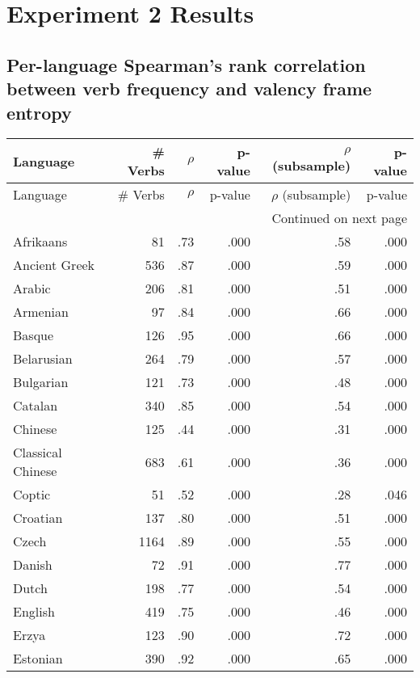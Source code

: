 \chapter{Experiment 2 Results}
\section{Per-language Spearman's rank correlation between verb frequency and valency frame entropy}\label{appendix:exp2-rho-freq-valency}
\begin{longtable}{lrrrrr}
    \toprule
    Language & \# Verbs & $\rho$ & p-value & $\rho$ (subsample) & p-value \\
    \midrule
    \endfirsthead
    \toprule
    Language & \# Verbs & $\rho$ & p-value & $\rho$ (subsample) & p-value \\
    \midrule
    \endhead
    \midrule
    \multicolumn{6}{r}{Continued on next page} \\
    \midrule
    \endfoot
    \bottomrule
    \endlastfoot
    Afrikaans & 81 & .73 & .000 & .58 & .000 \\
    Ancient Greek & 536 & .87 & .000 & .59 & .000 \\
    Arabic & 206 & .81 & .000 & .51 & .000 \\
    Armenian & 97 & .84 & .000 & .66 & .000 \\
    Basque & 126 & .95 & .000 & .66 & .000 \\
    Belarusian & 264 & .79 & .000 & .57 & .000 \\
    Bulgarian & 121 & .73 & .000 & .48 & .000 \\
    Catalan & 340 & .85 & .000 & .54 & .000 \\
    Chinese & 125 & .44 & .000 & .31 & .000 \\
    Classical Chinese & 683 & .61 & .000 & .36 & .000 \\
    Coptic & 51 & .52 & .000 & .28 & .046 \\
    Croatian & 137 & .80 & .000 & .51 & .000 \\
    Czech & 1164 & .89 & .000 & .55 & .000 \\
    Danish & 72 & .91 & .000 & .77 & .000 \\
    Dutch & 198 & .77 & .000 & .54 & .000 \\
    English & 419 & .75 & .000 & .46 & .000 \\
    Erzya & 123 & .90 & .000 & .72 & .000 \\
    Estonian & 390 & .92 & .000 & .65 & .000 \\

\end{longtable}
